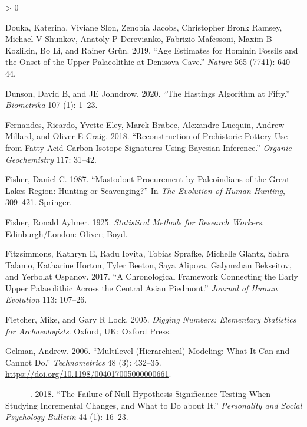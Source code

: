 \documentclass[
]{article}
\newlength{\cslhangindent}
\newenvironment{CSLReferences}[2] %
 {%
  \setlength{\parindent}{0pt}
  \ifodd #1 \everypar{\setlength{\hangindent}{\cslhangindent}}\ignorespaces\fi
  \ifnum #2 > 0
  \setlength{\parskip}{#2\baselineskip}
  \fi
 }%
 {}
\begin{document}
\begin{CSLReferences}{1}{0}
\leavevmode\hypertarget{ref-douka_age_2019}{}%
Douka, Katerina, Viviane Slon, Zenobia Jacobs, Christopher Bronk Ramsey,
Michael V Shunkov, Anatoly P Derevianko, Fabrizio Mafessoni, Maxim B
Kozlikin, Bo Li, and Rainer Grün. 2019. {``Age Estimates for Hominin
Fossils and the Onset of the {Upper} {Palaeolithic} at {Denisova}
{Cave}.''} \emph{Nature} 565 (7741): 640--44.

\leavevmode\hypertarget{ref-dunson_hastings_2020}{}%
Dunson, David B, and JE Johndrow. 2020. {``The {Hastings} Algorithm at
Fifty.''} \emph{Biometrika} 107 (1): 1--23.

\leavevmode\hypertarget{ref-fernandes_reconstruction_2018}{}%
Fernandes, Ricardo, Yvette Eley, Marek Brabec, Alexandre Lucquin, Andrew
Millard, and Oliver E Craig. 2018. {``Reconstruction of Prehistoric
Pottery Use from Fatty Acid Carbon Isotope Signatures Using {Bayesian}
Inference.''} \emph{Organic Geochemistry} 117: 31--42.

\leavevmode\hypertarget{ref-fisher_mastodont_1987}{}%
Fisher, Daniel C. 1987. {``Mastodont Procurement by {Paleoindians} of
the {Great} {Lakes} Region: Hunting or Scavenging?''} In \emph{The
Evolution of Human Hunting}, 309--421. Springer.

\leavevmode\hypertarget{ref-fisher_statistical_1925}{}%
Fisher, Ronald Aylmer. 1925. \emph{Statistical Methods for Research
Workers}. Edinburgh/London: Oliver; Boyd.

\leavevmode\hypertarget{ref-fitzsimmons_chronological_2017}{}%
Fitzsimmons, Kathryn E, Radu Iovita, Tobias Sprafke, Michelle Glantz,
Sahra Talamo, Katharine Horton, Tyler Beeton, Saya Alipova, Galymzhan
Bekseitov, and Yerbolat Ospanov. 2017. {``A Chronological Framework
Connecting the Early {Upper} {Palaeolithic} Across the {Central} {Asian}
Piedmont.''} \emph{Journal of Human Evolution} 113: 107--26.

\leavevmode\hypertarget{ref-fletcher_digging_2005}{}%
Fletcher, Mike, and Gary R Lock. 2005. \emph{Digging {Numbers}:
{Elementary} {Statistics} for {Archaeologists}}. Oxford, UK: Oxford
Press.

\leavevmode\hypertarget{ref-gelman_multilevel_2006}{}%
Gelman, Andrew. 2006. {``Multilevel ({Hierarchical}) {Modeling}: {What}
{It} {Can} and {Cannot} {Do}.''} \emph{Technometrics} 48 (3): 432--35.
\url{https://doi.org/10.1198/004017005000000661}.

\leavevmode\hypertarget{ref-gelman_failure_2018}{}%
---------. 2018. {``The Failure of Null Hypothesis Significance Testing
When Studying Incremental Changes, and What to Do about It.''}
\emph{Personality and Social Psychology Bulletin} 44 (1): 16--23.


\end{CSLReferences}
\end{document}
